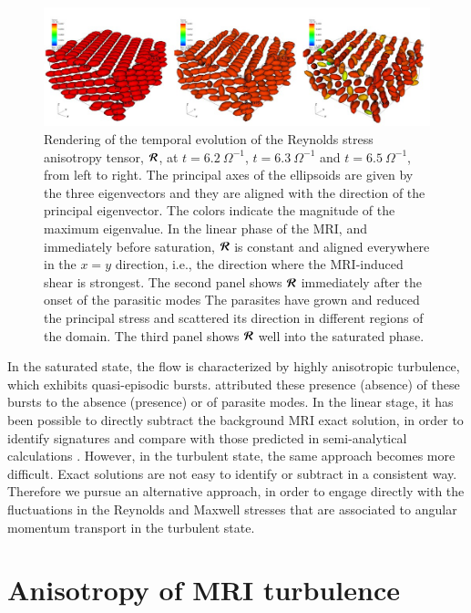 \documentclass[]{emulateapj}
\newcommand\bb[1]{\mbox{\boldmath{$#1$}}}
\begin{document}
\begin{figure}[ht]
\begin{center}
\includegraphics[width=0.89 \textwidth]{f11.png}
\caption{
Rendering of the temporal evolution of the Reynolds stress anisotropy tensor,
$\bb{\mathcal{R}}$, at $t=6.2 ~\Omega^{-1}$, $t=6.3 ~\Omega^{-1}$
and $t=6.5 ~\Omega^{-1}$, from left to right.
The principal axes of the ellipsoids are given by the three eigenvectors
and they are aligned with the direction of the principal eigenvector.
The colors indicate the magnitude of the maximum eigenvalue. In the linear 
phase of the MRI, and immediately before saturation, $\bb{\mathcal{R}}$ is 
constant and aligned everywhere in the $x=y$ direction, i.e., 
the direction where the MRI-induced shear 
is strongest.  The second panel shows $\bb{\mathcal{R}}$
immediately after the onset of the parasitic modes
The parasites have grown and reduced the
principal stress and scattered its direction in different regions of the domain.  The
third panel shows $\bb{\mathcal{R}}$ well into the saturated phase.
}
\label{maxtensor}
\end{center}
\end{figure}


In the saturated state, the flow is characterized by highly anisotropic
turbulence, which exhibits quasi-episodic bursts.
\citet{2008A&A...487....1B} attributed these presence (absence) of 
these bursts to the absence (presence) or  of parasite modes.  
In the linear stage, it has been possible
to directly subtract the background MRI exact solution, in order to
identify signatures and compare with those predicted in
semi-analytical calculations \citep{Pessah:2010ic}.  However, in the
turbulent state, the same approach becomes more difficult.  Exact
solutions are not easy to identify or subtract in a consistent way.
Therefore we pursue an alternative approach, in order to engage directly
with the fluctuations in the Reynolds and Maxwell stresses that are 
associated to angular momentum transport in the turbulent state.

\newpage

\section{Anisotropy of MRI turbulence}
\label{anisotropy}
\end{document}

